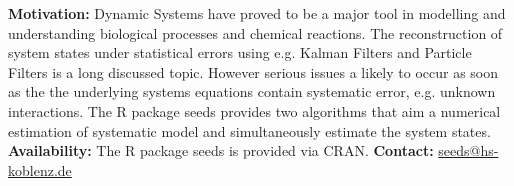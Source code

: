 \textbf{Motivation:} Dynamic Systems have proved to be a major tool in modelling 
and understanding biological processes and chemical reactions. The reconstruction of system 
states under statistical errors using e.g. Kalman Filters and Particle Filters is a long 
discussed topic. 
However serious issues a likely to occur as soon as the the underlying systems equations 
contain systematic error, e.g. unknown interactions. The R package \textsf{seeds} provides 
two algorithms that aim a numerical estimation of systematic model and simultaneously estimate 
the system states. \\
\textbf{Availability:} The R package \textsf{seeds} is provided via CRAN.
\textbf{Contact:} \href{seeds@hs-koblenz.de}{seeds@hs-koblenz.de}
%
